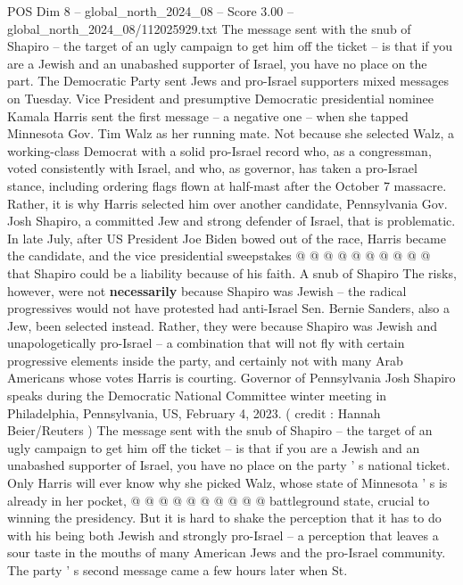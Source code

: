 \begin{textsample}{POS Dim 8 – global\_north\_2024\_08 – Score 3.00 – global\_north\_2024\_08/112025929.txt}  \label{ex:f8_pos_330}
The message sent with the snub of Shapiro -- the target of an ugly campaign to get him off the ticket -- is that if you are a Jewish and an unabashed supporter of Israel, you have no place on the part.
The Democratic Party sent Jews and pro-Israel supporters mixed messages on Tuesday.
Vice President and presumptive Democratic presidential nominee Kamala Harris sent the first message -- a negative one -- when she tapped Minnesota Gov.
Tim Walz as her running mate.
Not because she selected Walz, a working-class Democrat with a solid pro-Israel record who, as a congressman, voted consistently with Israel, and who, as governor, has taken a pro-Israel stance, including ordering flags flown at half-mast after the October 7 massacre.
Rather, it is why Harris selected him over another candidate, Pennsylvania Gov.
Josh Shapiro, a committed Jew and strong defender of Israel, that is problematic.
In late July, after US President Joe Biden bowed out of the race, Harris became the candidate, and the vice presidential sweepstakes @ @ @ @ @ @ @ @ @ @ that Shapiro could be a liability because of his faith.
A snub of Shapiro The risks, however, were not \textbf{necessarily} because Shapiro was Jewish -- the radical progressives would not have protested had anti-Israel Sen.
Bernie Sanders, also a Jew, been selected instead.
Rather, they were because Shapiro was Jewish and unapologetically pro-Israel -- a combination that will not fly with certain progressive elements inside the party, and certainly not with many Arab Americans whose votes Harris is courting.
Governor of Pennsylvania Josh Shapiro speaks during the Democratic National Committee winter meeting in Philadelphia, Pennsylvania, US, February 4, 2023. ( credit : Hannah Beier/Reuters ) The message sent with the snub of Shapiro -- the target of an ugly campaign to get him off the ticket -- is that if you are a Jewish and an unabashed supporter of Israel, you have no place on the party ' s national ticket.
Only Harris will ever know why she picked Walz, whose state of Minnesota ' s is already in her pocket, @ @ @ @ @ @ @ @ @ @ battleground state, crucial to winning the presidency.
But it is hard to shake the perception that it has to do with his being both Jewish and strongly pro-Israel -- a perception that leaves a sour taste in the mouths of many American Jews and the pro-Israel community.
The party ' s second message came a few hours later when St.

\end{textsample}
